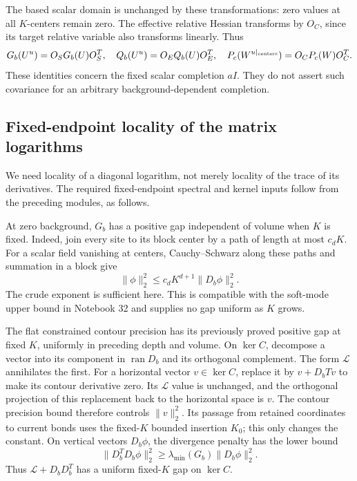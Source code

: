 The based scalar domain is unchanged by these transformations:
zero values at all \(K\)-centers remain zero. The effective
relative Hessian transforms by \(O_C\), since its target
relative variable also transforms linearly. Thus
\begin{equation}
 G_b(U^u)=O_SG_b(U)O_S^T,\quad
 Q_b(U^u)=O_EQ_b(U)O_E^T,\quad
 P_c(W^{u|_{\rm centers}})=O_CP_c(W)O_C^T.
 \label{gdd-matrix-covariance}
\end{equation}
These identities concern the fixed scalar completion \(aI\).
They do not assert such covariance for an arbitrary
background-dependent completion.

\subsection{Fixed-endpoint locality of the matrix logarithms}
\label{gdd-log-locality-section}

We need locality of a diagonal logarithm, not merely locality
of the trace of its derivatives. The required fixed-endpoint
spectral and kernel inputs follow from the preceding modules,
as follows.

At zero background, \(G_b\) has a positive gap independent
of volume when \(K\) is fixed. Indeed, join every site to
its block center by a path of length at most \(c_dK\).
For a scalar field vanishing at centers, Cauchy--Schwarz
along these paths and summation in a block give
\begin{equation}
 \|\phi\|_2^2\le c_d K^{d+1}\|D_b\phi\|_2^2.
 \label{gdd-pinned-Poincare}
\end{equation}
The crude exponent is sufficient here. This is compatible
with the soft-mode upper bound in Notebook 32 and supplies
no gap uniform as \(K\) grows.

The flat constrained contour precision has its previously
proved positive gap at fixed \(K\), uniformly in preceding
depth and volume. On \(\ker C\), decompose a vector into
its component in \(\operatorname{ran}D_b\) and its orthogonal
complement. The form \(\mathcal L\) annihilates the first.
For a horizontal vector \(v\in\ker C\), replace it by
\(v+D_bTv\) to make its contour derivative zero.
Its \(\mathcal L\) value is unchanged, and the orthogonal
projection of this replacement back to the horizontal
space is \(v\). The contour precision bound therefore
controls \(\|v\|_2^2\). Its passage from retained
coordinates to current bonds uses the fixed-\(K\)
bounded insertion \(K_0\); this only changes the constant.
On vertical vectors \(D_b\phi\), the divergence penalty
has the lower bound
\[
 \|D_b^TD_b\phi\|_2^2
       \ge \lambda_{\min}(G_b)\|D_b\phi\|_2^2.
\]
Thus \(\mathcal L+D_bD_b^T\) has a uniform fixed-\(K\)
gap on \(\ker C\).


